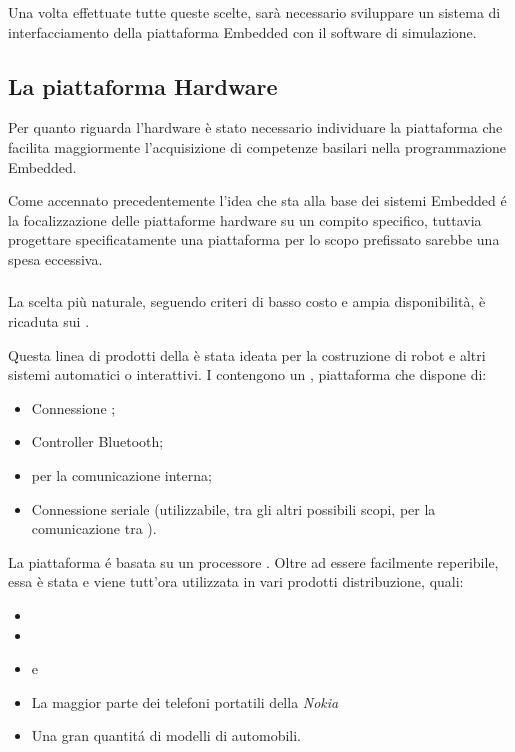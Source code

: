 Una volta effettuate tutte queste scelte, sar\`a necessario sviluppare un
sistema di interfacciamento della piattaforma Embedded con il software
di simulazione.

\subsection{La piattaforma Hardware}

Per quanto riguarda l'hardware \`e stato necessario individuare la
piattaforma che facilita maggiormente l'acquisizione di competenze
basilari nella programmazione Embedded.

Come accennato precedentemente l'idea che sta alla base dei sistemi
Embedded \'e la focalizzazione delle piattaforme hardware su un compito
specifico, tuttavia progettare specificatamente una piattaforma per lo
scopo prefissato sarebbe una spesa eccessiva.

\subsubsection{\nxt}

La scelta pi\`u naturale, seguendo criteri di basso costo e ampia
disponibilit\`a, \`e ricaduta sui \nxt.

Questa linea di prodotti della \lego \`e stata ideata per la costruzione di
robot e altri sistemi automatici o interattivi.  I \nxt{} contengono un   , piattaforma che
dispone di:

\begin{itemize}
\item Connessione ;
\item Controller Bluetooth;
\item {} \isquarec per la comunicazione interna;
\item Connessione seriale  (utilizzabile, tra gli altri
      possibili scopi, per la comunicazione tra \nxt).
\end{itemize}

La piattaforma  \'e basata su un processore
. Oltre ad essere facilmente reperibile, essa \`e stata e
viene tutt'ora utilizzata in vari prodotti distribuzione, quali:
\begin{itemize}
    \item {}
    \item {}
    \item {} e 
    \item La maggior parte dei telefoni portatili della \emph{Nokia}
    \item Una gran quantit\'a di modelli di automobili.
\end{itemize}

